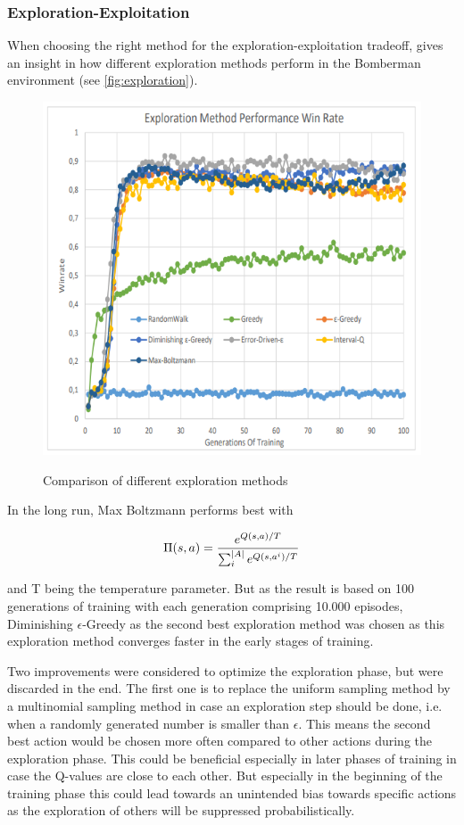 \subsubsection{Exploration-Exploitation}
\label{ch:approachBa}

When choosing the right method for the exploration-exploitation tradeoff, \cite{Kormelink2018} gives an insight in how different exploration methods perform in the Bomberman environment (see \autoref{fig:exploration}). 

\begin{figure}[ht]
	\centering
	\includegraphics[width=0.6\linewidth]{figures/exploration.PNG}
	\caption{Comparison of different exploration methods}
	\label{fig:exploration}
	\cite{Kormelink2018}
\end{figure}

In the long run, Max Boltzmann performs best with 

\begin{equation}
	\Pi(s,a) = \frac{e^{Q(s,a)/T}}{\sum_i^{\lvert A\rvert}e^{Q(s,a^i)/T}}
\end{equation}

and T being the temperature parameter. But as the result is based on 100 generations of training with each generation comprising 10.000 episodes, Diminishing $\epsilon$-Greedy as the second best exploration method was chosen as this exploration method converges faster in the early stages of training.

Two improvements were considered to optimize the exploration phase, but were discarded in the end. The first one is to replace the uniform sampling method by a multinomial sampling method in case an exploration step should be done, i.e. when a randomly generated number is smaller than $\epsilon$. This means the second best action would be chosen more often compared to other actions during the exploration phase. This could be beneficial especially in later phases of training in case the Q-values are close to each other. But especially in the beginning of the training phase this could lead towards an unintended bias towards specific actions as the exploration of others will be suppressed probabilistically.


